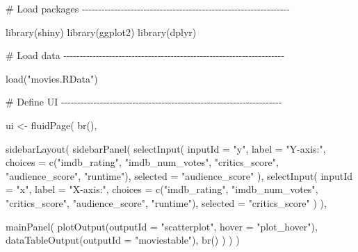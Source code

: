 \documentclass[
  letterpaper,
  DIV=11,
  numbers=noendperiod]{scrreprt}
\newenvironment{Shaded}{\begin{snugshade}}{\end{snugshade}}
\newcommand{\AttributeTok}[1]{\textcolor[rgb]{0.40,0.46,0.14}{#1}}
\newcommand{\CommentTok}[1]{\textcolor[rgb]{0.37,0.37,0.37}{#1}}
\newcommand{\FunctionTok}[1]{\textcolor[rgb]{0.28,0.35,0.67}{#1}}
\newcommand{\NormalTok}[1]{\textcolor[rgb]{0.00,0.46,0.62}{#1}}
\newcommand{\OtherTok}[1]{\textcolor[rgb]{0.00,0.46,0.62}{#1}}
\newcommand{\StringTok}[1]{\textcolor[rgb]{0.13,0.47,0.30}{#1}}
\begin{document}
\begin{Shaded}
\begin{Highlighting}[]
\CommentTok{\# Load packages {-}{-}{-}{-}{-}{-}{-}{-}{-}{-}{-}{-}{-}{-}{-}{-}{-}{-}{-}{-}{-}{-}{-}{-}{-}{-}{-}{-}{-}{-}{-}{-}{-}{-}{-}{-}{-}{-}{-}{-}{-}{-}{-}{-}{-}{-}{-}{-}{-}{-}{-}{-}{-}{-}{-}{-}{-}{-}{-}{-}{-}{-}{-}{-}}

\FunctionTok{library}\NormalTok{(shiny)}
\FunctionTok{library}\NormalTok{(ggplot2)}
\FunctionTok{library}\NormalTok{(dplyr)}

\CommentTok{\# Load data {-}{-}{-}{-}{-}{-}{-}{-}{-}{-}{-}{-}{-}{-}{-}{-}{-}{-}{-}{-}{-}{-}{-}{-}{-}{-}{-}{-}{-}{-}{-}{-}{-}{-}{-}{-}{-}{-}{-}{-}{-}{-}{-}{-}{-}{-}{-}{-}{-}{-}{-}{-}{-}{-}{-}{-}{-}{-}{-}{-}{-}{-}{-}{-}{-}{-}{-}{-}}

\FunctionTok{load}\NormalTok{(}\StringTok{"movies.RData"}\NormalTok{)}

\CommentTok{\# Define UI {-}{-}{-}{-}{-}{-}{-}{-}{-}{-}{-}{-}{-}{-}{-}{-}{-}{-}{-}{-}{-}{-}{-}{-}{-}{-}{-}{-}{-}{-}{-}{-}{-}{-}{-}{-}{-}{-}{-}{-}{-}{-}{-}{-}{-}{-}{-}{-}{-}{-}{-}{-}{-}{-}{-}{-}{-}{-}{-}{-}{-}{-}{-}{-}{-}{-}{-}{-}}

\NormalTok{ui }\OtherTok{\textless{}{-}} \FunctionTok{fluidPage}\NormalTok{(}
  \FunctionTok{br}\NormalTok{(),}

  \FunctionTok{sidebarLayout}\NormalTok{(}
    \FunctionTok{sidebarPanel}\NormalTok{(}
      \FunctionTok{selectInput}\NormalTok{(}
        \AttributeTok{inputId =} \StringTok{"y"}\NormalTok{, }\AttributeTok{label =} \StringTok{"Y{-}axis:"}\NormalTok{,}
        \AttributeTok{choices =} \FunctionTok{c}\NormalTok{(}\StringTok{"imdb\_rating"}\NormalTok{, }\StringTok{"imdb\_num\_votes"}\NormalTok{, }\StringTok{"critics\_score"}\NormalTok{, }\StringTok{"audience\_score"}\NormalTok{, }\StringTok{"runtime"}\NormalTok{),}
        \AttributeTok{selected =} \StringTok{"audience\_score"}
\NormalTok{      ),}
      \FunctionTok{selectInput}\NormalTok{(}
        \AttributeTok{inputId =} \StringTok{"x"}\NormalTok{, }\AttributeTok{label =} \StringTok{"X{-}axis:"}\NormalTok{,}
        \AttributeTok{choices =} \FunctionTok{c}\NormalTok{(}\StringTok{"imdb\_rating"}\NormalTok{, }\StringTok{"imdb\_num\_votes"}\NormalTok{, }\StringTok{"critics\_score"}\NormalTok{, }\StringTok{"audience\_score"}\NormalTok{, }\StringTok{"runtime"}\NormalTok{),}
        \AttributeTok{selected =} \StringTok{"critics\_score"}
\NormalTok{      )}
\NormalTok{    ),}

    \FunctionTok{mainPanel}\NormalTok{(}
      \FunctionTok{plotOutput}\NormalTok{(}\AttributeTok{outputId =} \StringTok{"scatterplot"}\NormalTok{, }\AttributeTok{hover =} \StringTok{"plot\_hover"}\NormalTok{),}
      \FunctionTok{dataTableOutput}\NormalTok{(}\AttributeTok{outputId =} \StringTok{"moviestable"}\NormalTok{),}
      \FunctionTok{br}\NormalTok{()}
\NormalTok{    )}
\NormalTok{  )}
\NormalTok{)}


\end{Highlighting}
\end{Shaded}
\end{document}
